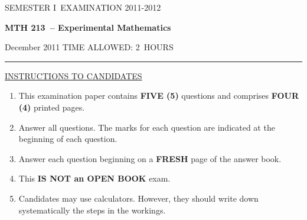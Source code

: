 \documentclass[12pt]{article}
\newcommand{\masunitnumber}{MTH 213}
\newcommand{\examdate}{December 2011}
\newcommand{\academicyear}{2011-2012}
\newcommand{\semester}{I}
\newcommand{\coursename}{Experimental Mathematics}
\newcommand{\numberofhours}{2}
\begin{document}
\setlength{\headsep}{5truemm}
\setlength{\headheight}{14.5truemm}
\setlength{\voffset}{-0.45truein}
\renewcommand{\headrulewidth}{0.0pt}
\begin{center}
SEMESTER \semester\ EXAMINATION \academicyear
\end{center}
\begin{center}
{\bf \masunitnumber\ -- \coursename}
\end{center}
\vspace{20truemm}

\noindent \examdate\hspace{55truemm} TIME ALLOWED: \numberofhours\ HOURS

\vspace{19truemm}
\hrule
\vspace{19truemm}

\noindent\underline{INSTRUCTIONS TO CANDIDATES}
\vspace{8truemm}
\begin{enumerate}
\item This examination paper contains {\bf FIVE (5)} questions and comprises 
{\bf FOUR (4)} printed pages.

\item Answer all questions. 
The marks for each question are indicated at the beginning of each question.


\item Answer each question beginning on a {\bf FRESH} page of the answer book.

\item This {\bf IS NOT an OPEN BOOK} exam.

\item Candidates may use calculators. However, they should write down systematically the steps in the workings.
\end{enumerate}

\newpage
\lhead{}
\rhead{\masunitnumber}
\chead{}
\lfoot{}
\cfoot{\thepage}
\rfoot{}
\setlength{\footskip}{45pt}
\end{document}
